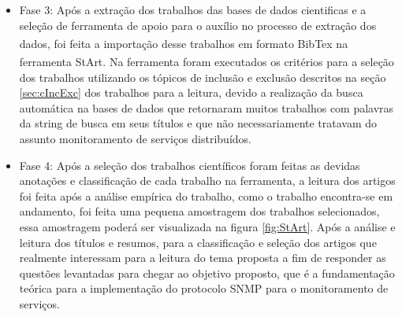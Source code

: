 \begin{itemize}
\item Fase 3: Após a extração dos trabalhos das bases de dados cientificas e a seleção de ferramenta de apoio para o auxílio no processo de extração dos dados, foi feita a importação desse trabalhos em formato BibTex\textsuperscript{\textregistered}\cite{chomsky1969linguistica} na ferramenta StArt\textsuperscript{\textregistered}. Na ferramenta foram executados os critérios para a seleção dos trabalhos utilizando os tópicos de inclusão e exclusão descritos na seção \ref{sec:cIncExc} dos trabalhos para a leitura, devido a realização da busca automática na bases de dados que retornaram muitos trabalhos com palavras da string de busca em seus títulos e que não necessariamente tratavam do assunto monitoramento de serviços distribuídos.

\item Fase 4: Após a seleção dos trabalhos científicos foram feitas as devidas anotações e classificação de cada trabalho na ferramenta, a leitura dos artigos foi feita após a análise empírica do trabalho, como o trabalho encontra-se em andamento, foi feita uma pequena amostragem dos trabalhos selecionados, essa amostragem poderá ser visualizada na figura \ref{fig:StArt}. Após a análise e leitura dos títulos e resumos, para a classificação e seleção dos artigos que realmente interessam para a leitura do tema proposta a fim de responder as questões levantadas para chegar ao objetivo proposto, que é a fundamentação teórica para a implementação do protocolo SNMP para o monitoramento de serviços. 
\end{itemize}

